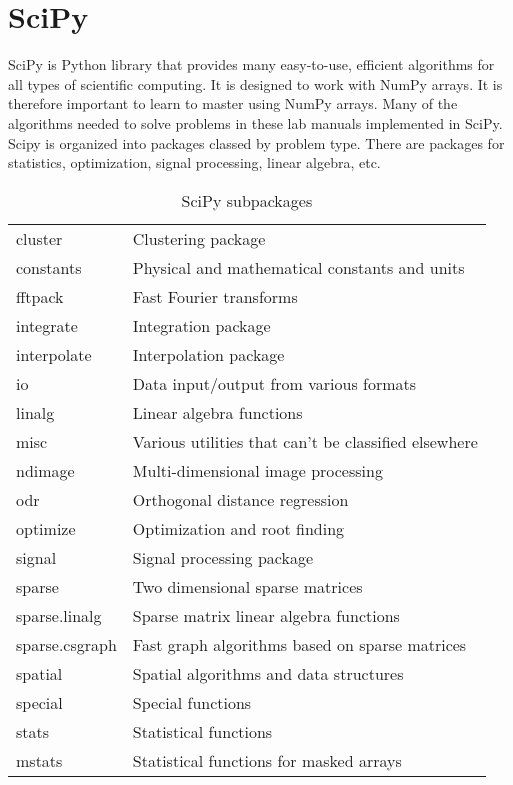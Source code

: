 \section*{SciPy}
SciPy is Python library that provides many easy-to-use, efficient algorithms for all types of scientific computing.
It is designed to work with NumPy arrays.  It is therefore important to learn to master using NumPy arrays.
Many of the algorithms needed to solve problems in these lab manuals implemented in SciPy.
Scipy is organized into packages classed by problem type.
There are packages for statistics, optimization, signal processing, linear algebra, etc.
\begin{table}[h]
\centering
\begin{tabular}{|l|l|}
\hline
cluster & Clustering package \\
constants & Physical and mathematical constants and units \\
fftpack & Fast Fourier transforms \\
integrate & Integration package \\
interpolate & Interpolation package \\
io & Data input/output from various formats \\
linalg & Linear algebra functions \\
misc & Various utilities that can't be classified elsewhere \\
ndimage & Multi-dimensional image processing \\ 
odr & Orthogonal distance regression \\
optimize & Optimization and root finding \\
signal & Signal processing package \\
sparse & Two dimensional sparse matrices \\
sparse.linalg & Sparse matrix linear algebra functions \\
sparse.csgraph & Fast graph algorithms based on sparse matrices \\
spatial & Spatial algorithms and data structures \\ 
special & Special functions \\ 
stats & Statistical functions \\
mstats & Statistical functions for masked arrays \\
\hline
\end{tabular}
\caption{SciPy subpackages}
\end{table}

